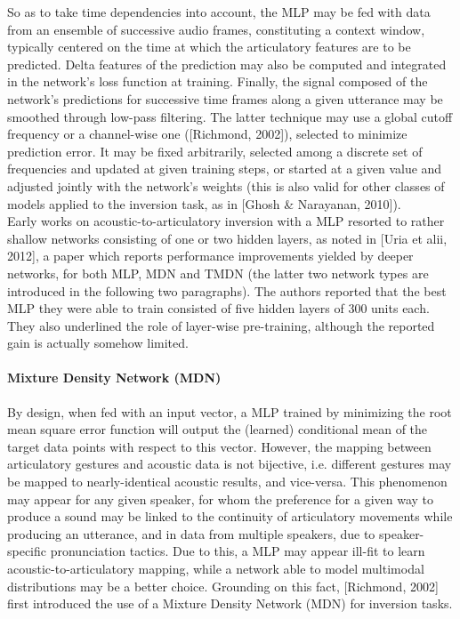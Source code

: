 So as to take time dependencies into account, the MLP may be fed with data from an ensemble of successive audio frames, constituting a context window, typically centered on the time at which the articulatory features are to be predicted. Delta features of the prediction may also be computed and integrated in the network's loss function at training. Finally, the signal composed of the network's predictions for successive time frames along a given utterance may be smoothed through low-pass filtering. The latter technique may use a global cutoff frequency or a channel-wise one ([Richmond, 2002]), selected to minimize prediction error. It may be fixed arbitrarily, selected among a discrete set of frequencies and updated at given training steps, or started at a given value and adjusted jointly with the network's weights (this is also valid for other classes of models applied to the inversion task, as in [Ghosh \& Narayanan, 2010]).\\

Early works on acoustic-to-articulatory inversion with a MLP resorted to rather shallow networks consisting of one or two hidden layers, as noted in [Uria et alii, 2012], a paper which reports performance improvements yielded by deeper networks, for both MLP, MDN and TMDN (the latter two network types are introduced in the following two paragraphs). The authors reported that the best MLP they were able to train consisted of five hidden layers of 300 units each. They also underlined the role of layer-wise pre-training, although the reported gain is actually somehow limited.\\


\paragraph{Mixture Density Network (MDN)}

By design, when fed with an input vector, a MLP trained by minimizing the root mean square error function will output the (learned) conditional mean of the target data points with respect to this vector. However, the mapping between articulatory gestures and acoustic data is not bijective, i.e. different gestures may be mapped to nearly-identical acoustic results, and vice-versa. This phenomenon may appear for any given speaker, for whom the preference for a given way to produce a sound may be linked to the continuity of articulatory movements while producing an utterance, and in data from multiple speakers, due to speaker-specific pronunciation tactics. Due to this, a MLP may appear ill-fit to learn acoustic-to-articulatory mapping, while a network able to model multimodal distributions may be a better choice. Grounding on this fact, [Richmond, 2002] first introduced the use of a Mixture Density Network (MDN) for inversion tasks.\\

